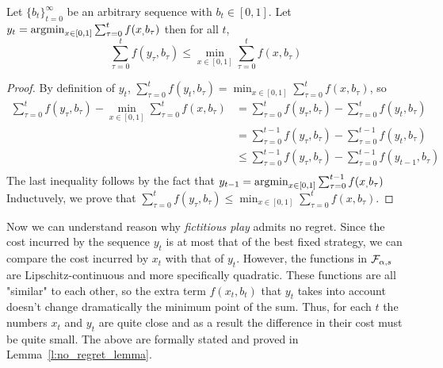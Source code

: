 \begin{lemma}\label{l:y_t}
Let $\{b_t\}_{t=0}^\infty$ be an arbitrary sequence with $b_t \in [0,1]$. Let $y_t = \operatorname*{argmin}_{x \in [0,1]}\sum_{\tau=0}^tf(x_,b_\tau)$
then for all $t$,
\[
\sum_{\tau=0}^t f(y_\tau,b_\tau) \leq \min_{x \in [0,1]}\sum_{\tau = 0}^tf(x,b_\tau)
\]
\end{lemma}

\begin{proof}By definition of $y_t$,
  $\sum_{\tau=0}^t f(y_t,b_\tau)=\min_{ x \in [0,1]} \sum_{\tau=0}^t f(x,b_\tau)$, so
  \begin{align*}
    \sum_{\tau=0}^t f(y_\tau,b_\tau) - \min_{ x \in [0,1]} \sum_{\tau=0}^t f(x,b_\tau) &=
    \sum_{\tau=0}^t f(y_\tau,b_\tau) - \sum_{\tau=0}^t f(y_t,b_\tau)\\
    &= \sum_{\tau=0}^{t-1} f(y_\tau,b_\tau) - \sum_{\tau=0}^{t-1} f(y_t,b_\tau)\\
    &\leq \sum_{\tau=0}^{t-1} f(y_\tau,b_\tau) - \sum_{\tau=0}^{t-1} f(y_{t-1},b_\tau)\\
  \end{align*}
  The last inequality follows by the fact that $y_{t-1} = \operatorname*{argmin}_{x \in [0,1]}\sum_{\tau=0}^{t-1}f(x_,b_\tau)$
  Inductuvely, we prove that $\sum_{\tau=0}^t f(y_\tau,b_\tau) \leq \min_{ x \in [0,1]} \sum_{\tau=0}^t f(x,b_\tau)$.
\end{proof}

Now we can understand reason why \emph{fictitious play}
admits no regret. Since the cost incurred by the sequence $y_t$ is at most that
of the best fixed strategy, we can compare the cost incurred by $x_t$ with
that of $y_t$.  However, the functions in $\mathcal{F}_{\alpha,s}$ are 
Lipschitz-continuous and more specifically quadratic.
These functions are all "similar" to each other, so the extra 
term $f(x_t,b_t)$ that $y_t$ takes into account doesn't change 
dramatically the minimum point of the sum. Thus, for each $t$ the 
numbers $x_t$ and $y_t$ are quite close and as a result the 
difference in their cost must be quite small. The above are 
formally stated and proved in Lemma~\ref{l:no_regret_lemma}.

